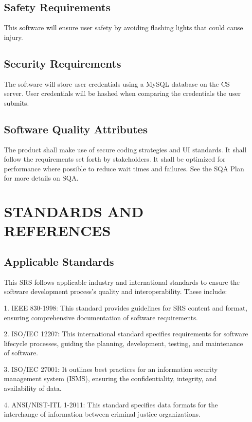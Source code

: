 \documentclass[letterpaper,12pt,oneside,listof=totoc]{scrreprt}
\begin{document}
\section{Safety Requirements}
    This software will ensure user safety by avoiding flashing lights that could cause injury.

\section{Security Requirements}
The software will store user credentials using a MySQL database on the CS server. User credentials will be hashed when comparing the credentials the user submits.
    

\section{Software Quality Attributes}
The product shall make use of secure coding strategies and UI standards. It shall follow the requirements set forth by stakeholders. It shall be optimized for performance where possible to reduce wait times and failures. See the SQA Plan for more details on SQA.


\chapter{STANDARDS AND REFERENCES}

\section{Applicable Standards}
    This SRS follows applicable industry and international standards to ensure the software development process's quality and interoperability. These include:

1. IEEE 830-1998: This standard provides guidelines for SRS content and format, ensuring comprehensive documentation of software requirements.

2. ISO/IEC 12207: This international standard specifies requirements for software lifecycle processes, guiding the planning, development, testing, and maintenance of software.

3. ISO/IEC 27001: It outlines best practices for an information security management system (ISMS), ensuring the confidentiality, integrity, and availability of data.

4. ANSI/NIST-ITL 1-2011: This standard specifies data formats for the interchange of information between criminal justice organizations.
\end{document}
